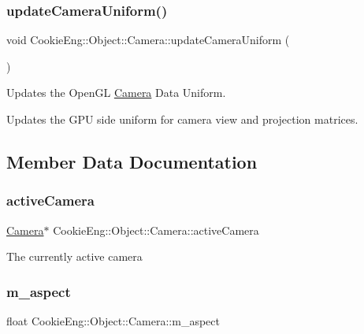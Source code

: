 \subsubsection{\texorpdfstring{update\+Camera\+Uniform()}{updateCameraUniform()}}
{\footnotesize\ttfamily void Cookie\+Eng\+::\+Object\+::\+Camera\+::update\+Camera\+Uniform (\begin{DoxyParamCaption}{ }\end{DoxyParamCaption})}



Updates the Open\+GL \hyperlink{class_cookie_eng_1_1_object_1_1_camera}{Camera} Data Uniform. 

Updates the G\+PU side uniform for camera view and projection matrices. 

\subsection{Member Data Documentation}
\mbox{\label{class_cookie_eng_1_1_object_1_1_camera_a552d79d05b0478c0ce92aa1d673ea1a7}} 
\subsubsection{\texorpdfstring{active\+Camera}{activeCamera}}
{\footnotesize\ttfamily \hyperlink{class_cookie_eng_1_1_object_1_1_camera}{Camera}$\ast$ Cookie\+Eng\+::\+Object\+::\+Camera\+::active\+Camera\hspace{0.3cm}{\ttfamily [static]}}

The currently active camera \mbox{\label{class_cookie_eng_1_1_object_1_1_camera_a86c6f04a4f39bfa931493b1f6b9c013c}} 
\subsubsection{\texorpdfstring{m\+\_\+aspect}{m\_aspect}}
{\footnotesize\ttfamily float Cookie\+Eng\+::\+Object\+::\+Camera\+::m\+\_\+aspect\hspace{0.3cm}{\ttfamily [protected]}}

